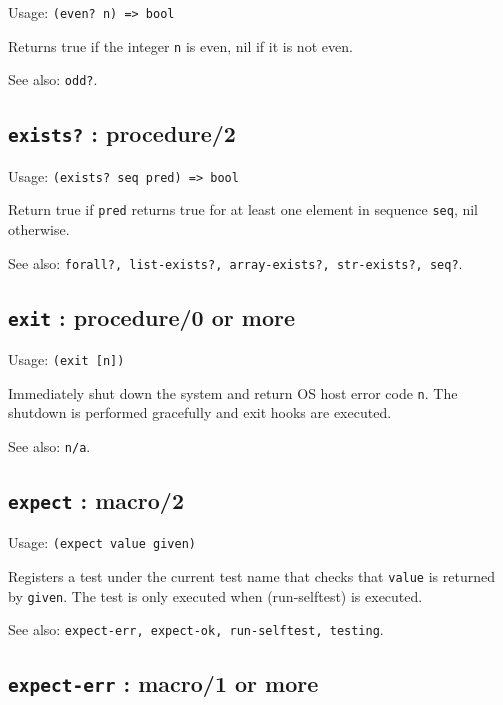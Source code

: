 \documentclass[
]{article}
\newcommand{\passthrough}[1]{#1}
\begin{document}
Usage: \passthrough{\lstinline!(even? n) => bool!}

Returns true if the integer \passthrough{\lstinline!n!} is even, nil if
it is not even.

See also: \passthrough{\lstinline!odd?!}.

\hypertarget{exists-procedure2-1}{%
\subsection{\texorpdfstring{\texttt{exists?} :
procedure/2}{exists? : procedure/2}}\label{exists-procedure2-1}}

Usage: \passthrough{\lstinline!(exists? seq pred) => bool!}

Return true if \passthrough{\lstinline!pred!} returns true for at least
one element in sequence \passthrough{\lstinline!seq!}, nil otherwise.

See also:
\passthrough{\lstinline!forall?, list-exists?, array-exists?, str-exists?, seq?!}.

\hypertarget{exit-procedure0-or-more-1}{%
\subsection{\texorpdfstring{\texttt{exit} : procedure/0 or
more}{exit : procedure/0 or more}}\label{exit-procedure0-or-more-1}}

Usage: \passthrough{\lstinline!(exit [n])!}

Immediately shut down the system and return OS host error code
\passthrough{\lstinline!n!}. The shutdown is performed gracefully and
exit hooks are executed.

See also: \passthrough{\lstinline!n/a!}.

\hypertarget{expect-macro2-1}{%
\subsection{\texorpdfstring{\texttt{expect} :
macro/2}{expect : macro/2}}\label{expect-macro2-1}}

Usage: \passthrough{\lstinline!(expect value given)!}

Registers a test under the current test name that checks that
\passthrough{\lstinline!value!} is returned by
\passthrough{\lstinline!given!}. The test is only executed when
(run-selftest) is executed.

See also:
\passthrough{\lstinline!expect-err, expect-ok, run-selftest, testing!}.

\hypertarget{expect-err-macro1-or-more-1}{%
\subsection{\texorpdfstring{\texttt{expect-err} : macro/1 or
more}{expect-err : macro/1 or more}}\label{expect-err-macro1-or-more-1}}
\end{document}

